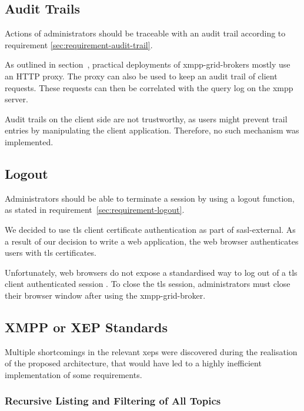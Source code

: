 \subsection{Audit Trails}

Actions of administrators should be traceable with an audit trail according to requirement \ref{sec:requirement-audit-trail}.

As outlined in section~, practical deployments of \glspl{xmpp-grid-broker} mostly use an HTTP proxy.
The proxy can also be used to keep an audit trail of client requests.
These requests can then be correlated with the query log on the \gls{xmpp} server.

Audit trails on the client side are not trustworthy, as users might prevent trail entries by manipulating the client application.
Therefore, no such mechanism was implemented.

\subsection{Logout}

Administrators should be able to terminate a session by using a logout function, as stated in requirement~\ref{sec:requirement-logout}.

We decided to use \gls{tls} client certificate authentication as part of \gls{sasl-external}.
As a result of our decision to write a web application, the web browser authenticates users with \gls{tls} certificates.

Unfortunately, web browsers do not expose a standardised way to log out of a \gls{tls} client authenticated session \cite{practical-issues-with-tls-client}.
To close the \gls{tls} session, administrators must close their browser window after using the \gls{xmpp-grid-broker}.

\subsection{XMPP or XEP Standards}

Multiple shortcomings in the relevant \glspl{xep} were discovered during the realisation of the proposed architecture, that would have led to a highly inefficient implementation of some requirements.

\subsubsection{Recursive Listing and Filtering of All Topics}

